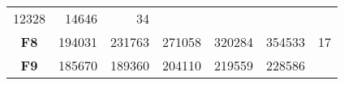 \documentclass[12pt,a4paper]{article}
\begin{document}
\begin{longtable}[c]{@{}crrrrrr@{}}
\begin{minipage}[t]{0.10\columnwidth}
12328
\strut\end{minipage} &
\begin{minipage}[t]{0.11\columnwidth}\raggedleft\strut
14646
\strut\end{minipage} &
\begin{minipage}[t]{0.07\columnwidth}\raggedleft\strut
34
\strut\end{minipage}\tabularnewline
\begin{minipage}[t]{0.11\columnwidth}\centering\strut
\textbf{F8}
\strut\end{minipage} &
\begin{minipage}[t]{0.08\columnwidth}\raggedleft\strut
194031
\strut\end{minipage} &
\begin{minipage}[t]{0.08\columnwidth}\raggedleft\strut
231763
\strut\end{minipage} &
\begin{minipage}[t]{0.09\columnwidth}\raggedleft\strut
271058
\strut\end{minipage} &
\begin{minipage}[t]{0.10\columnwidth}\raggedleft\strut
320284
\strut\end{minipage} &
\begin{minipage}[t]{0.11\columnwidth}\raggedleft\strut
354533
\strut\end{minipage} &
\begin{minipage}[t]{0.07\columnwidth}\raggedleft\strut
17
\strut\end{minipage}\tabularnewline
\begin{minipage}[t]{0.11\columnwidth}\centering\strut
\textbf{F9}
\strut\end{minipage} &
\begin{minipage}[t]{0.08\columnwidth}\raggedleft\strut
185670
\strut\end{minipage} &
\begin{minipage}[t]{0.08\columnwidth}\raggedleft\strut
189360
\strut\end{minipage} &
\begin{minipage}[t]{0.09\columnwidth}\raggedleft\strut
204110
\strut\end{minipage} &
\begin{minipage}[t]{0.10\columnwidth}\raggedleft\strut
219559
\strut\end{minipage} &
\begin{minipage}[t]{0.11\columnwidth}\raggedleft\strut
228586
\strut\end{minipage} &
\begin{minipage}[t]{0.07\columnwidth}\raggedleft\strut

\end{minipage}
\end{longtable}
\end{document}
